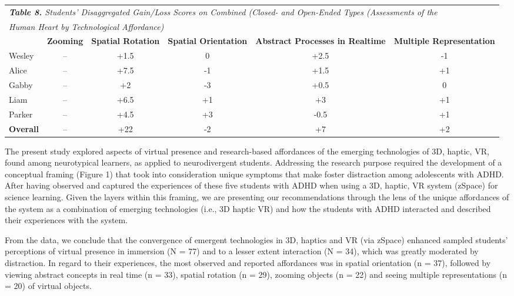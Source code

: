 \documentclass[11.5pt]{sig-alternate} %
\begin{document}
\begin{large}
\begin{table}
\begin{tabularx}{\textwidth}[h]{lccccc}
\hline
\multicolumn{6}{l}{\textit{\textbf{Table 8.} Students' Disaggregated Gain/Loss Scores on Combined (Closed- and Open-Ended Types (Assessments of the}} \\
\multicolumn{6}{l}{\textit{Human  Heart by Technological Affordance)}} \\
\hline
 & \textbf{Zooming} & \textbf{Spatial Rotation} & \textbf{Spatial Orientation} & \textbf{Abstract Processes in Realtime} & \textbf{Multiple Representation} \\
\hline
Wesley & -- & +1.5 & 0 & +2.5 & -1 \\
Alice & -- & +7.5 & -1 & +1.5 & +1 \\
Gabby & -- & +2 & -3 & +0.5 & 0 \\
Liam & -- & +6.5 & +1 & +3 & +1 \\
Parker & -- & +4.5 & +3 & -0.5 & +1 \\
\hline
\textbf{Overall} & -- & +22 & -2 & +7 & +2 \\
\hline
\end{tabularx}
\end{table}

The present study explored aspects of virtual presence and research-based affordances of the emerging technologies of 3D, haptic, VR, found among neurotypical learners, as applied to neurodivergent students. Addressing the research purpose required the development of a conceptual framing (Figure 1) that took into consideration unique symptoms that make foster distraction among adolescents with ADHD. After having observed and captured the experiences of these five students with ADHD when using a 3D, haptic, VR system (zSpace) for science learning. Given the layers within this framing, we are presenting our recommendations through the lens of the unique affordances of the system as a combination of emerging technologies (i.e., 3D haptic VR) and how the students with ADHD interacted and described their experiences with the system. 

	From the data, we conclude that the convergence of emergent technologies in 3D, haptics and VR (via zSpace) enhanced sampled students’ perceptions of virtual presence in immersion (N = 77) and to a lesser extent interaction (N = 34), which was greatly moderated by distraction. In regard to their experiences, the most observed and reported affordances was in spatial orientation (n = 37), followed by viewing abstract concepts in real time (n = 33), spatial rotation (n = 29), zooming objects (n = 22) and seeing multiple representations (n = 20) of virtual objects. 
 

\end{large}
\end{document}
